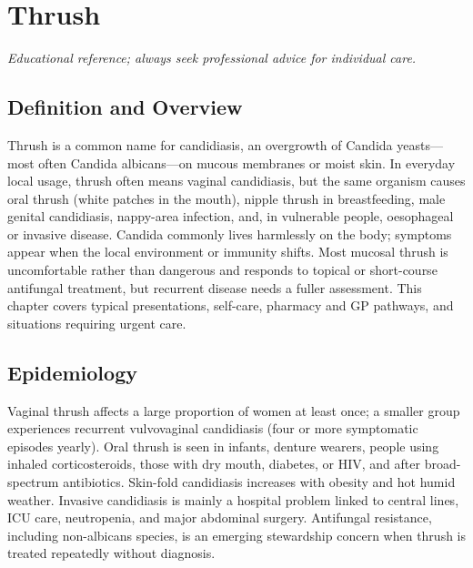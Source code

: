 \chapter{Thrush}

\medskip
\noindent\textit{Educational reference; always seek professional advice for individual care.}

\section*{Definition and Overview}
Thrush is a common name for candidiasis, an overgrowth of Candida yeasts---most often Candida albicans---on mucous membranes or moist skin. In everyday local usage, thrush often means vaginal candidiasis, but the same organism causes oral thrush (white patches in the mouth), nipple thrush in breastfeeding, male genital candidiasis, nappy-area infection, and, in vulnerable people, oesophageal or invasive disease. Candida commonly lives harmlessly on the body; symptoms appear when the local environment or immunity shifts. Most mucosal thrush is uncomfortable rather than dangerous and responds to topical or short-course antifungal treatment, but recurrent disease needs a fuller assessment. This chapter covers typical presentations, self-care, pharmacy and GP pathways, and situations requiring urgent care.

\section*{Epidemiology}
Vaginal thrush affects a large proportion of women at least once; a smaller group experiences recurrent vulvovaginal candidiasis (four or more symptomatic episodes yearly). Oral thrush is seen in infants, denture wearers, people using inhaled corticosteroids, those with dry mouth, diabetes, or HIV, and after broad-spectrum antibiotics. Skin-fold candidiasis increases with obesity and hot humid weather. Invasive candidiasis is mainly a hospital problem linked to central lines, ICU care, neutropenia, and major abdominal surgery. Antifungal resistance, including non-albicans species, is an emerging stewardship concern when thrush is treated repeatedly without diagnosis.

